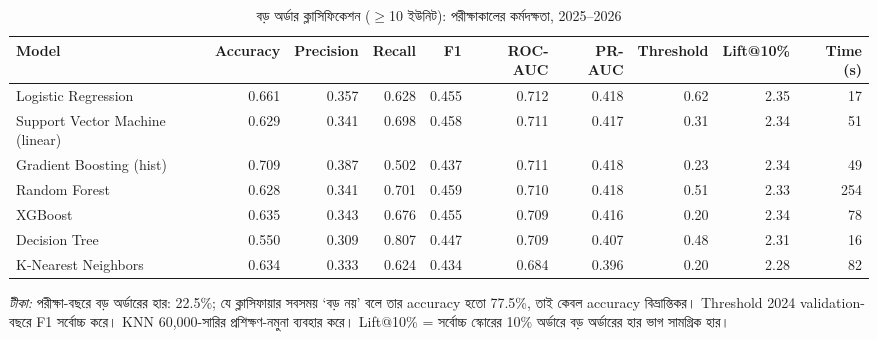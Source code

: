 \begin{table}[htbp]
\centering
\footnotesize
\caption{বড় অর্ডার ক্লাসিফিকেশন ($\geq$10 ইউনিট): পরীক্ষাকালের কর্মদক্ষতা, 2025--2026}
\label{tab:classification}
\begin{adjustbox}{max width=\linewidth}
\begin{tabular}{lrrrrrrrrr}
\toprule
\textbf{Model} & \textbf{Accuracy} & \textbf{Precision} & \textbf{Recall} & \textbf{F1} & \textbf{ROC-AUC} & \textbf{PR-AUC} & \textbf{Threshold} & \textbf{Lift@10\%} & \textbf{Time (s)} \\
\midrule
Logistic Regression & 0.661 & 0.357 & 0.628 & 0.455 & 0.712 & 0.418 & 0.62 & 2.35 & 17 \\
Support Vector Machine (linear) & 0.629 & 0.341 & 0.698 & 0.458 & 0.711 & 0.417 & 0.31 & 2.34 & 51 \\
Gradient Boosting (hist) & 0.709 & 0.387 & 0.502 & 0.437 & 0.711 & 0.418 & 0.23 & 2.34 & 49 \\
Random Forest & 0.628 & 0.341 & 0.701 & 0.459 & 0.710 & 0.418 & 0.51 & 2.33 & 254 \\
XGBoost & 0.635 & 0.343 & 0.676 & 0.455 & 0.709 & 0.416 & 0.20 & 2.34 & 78 \\
Decision Tree & 0.550 & 0.309 & 0.807 & 0.447 & 0.709 & 0.407 & 0.48 & 2.31 & 16 \\
K-Nearest Neighbors & 0.634 & 0.333 & 0.624 & 0.434 & 0.684 & 0.396 & 0.20 & 2.28 & 82 \\
\bottomrule
\end{tabular}
\end{adjustbox}
\par\smallskip\parbox{0.92\linewidth}{\footnotesize\emph{টীকা:} পরীক্ষা-বছরে বড় অর্ডারের হার: 22.5\%; যে ক্লাসিফায়ার সবসময় `বড় নয়' বলে তার accuracy হতো 77.5\%, তাই কেবল accuracy বিভ্রান্তিকর। Threshold 2024 validation-বছরে F1 সর্বোচ্চ করে। KNN 60,000-সারির প্রশিক্ষণ-নমুনা ব্যবহার করে। Lift@10\% = সর্বোচ্চ স্কোরের 10\% অর্ডারে বড় অর্ডারের হার ভাগ সামগ্রিক হার।}
\end{table}